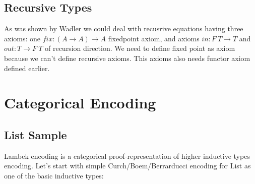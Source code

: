 \documentclass[11pt,oneside]{article}
\begin{document}
   \subsection{Recursive Types}

  As was shown by Wadler\cite{recursive} we could deal with recusrive equations having
  three axioms: one $fix: (A \rightarrow A) \rightarrow A$ fixedpoint axiom,
  and axioms $in: F\ T \rightarrow T$ and $out: T \rightarrow F\ T$ of recursion direction. We need to
  define fixed point as axiom because we can't define recursive axioms. This axioms
  also needs functor axiom defined earlier.


\begingroup
\parbox[t][][l]{0.40\textwidth}{

\begin{prooftree}
\end{prooftree}

\begin{prooftree}
\end{prooftree}

}
\hspace{0.1cm}
\parbox[t][][r]{0.60\textwidth}{


\begin{prooftree}
\end{prooftree}

}
\endgroup



\newpage
\section{Categorical Encoding}

\subsection{List Sample}
  Lambek encoding is a categorical proof-representation of higher inductive types encoding.
  Let's start with simple Curch/Boem/Berrarducci encoding for List as one of the basic inductive types:
\end{document}
